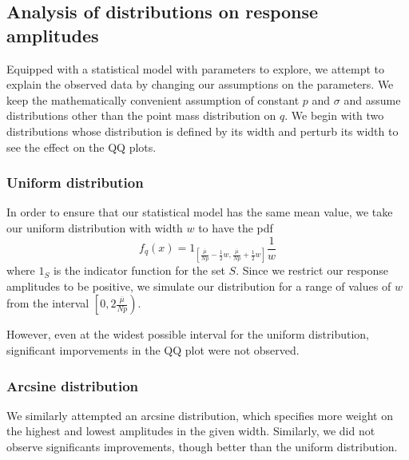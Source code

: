 \documentclass{article}
\begin{document}
\subsection{Analysis of distributions on response amplitudes}
Equipped with a statistical model with parameters to explore, we attempt to explain the observed data by changing our assumptions on the parameters. We keep the mathematically convenient assumption of constant $p$ and $\sigma$ and assume distributions other than the point mass distribution on $q$. We begin with two distributions whose distribution is defined by its width and perturb its width to see the effect on the QQ plots.

\subsubsection{Uniform distribution}
In order to ensure that our statistical model has the same mean value, we take our uniform distribution with width $w$ to have the pdf
\[
  f_q(x) = 1_{\left[\frac{\overline{\mu}}{Np}-\frac12 w,\frac{\overline{\mu}}{Np}+\frac12 w\right]} \frac1{w}
\]
where $1_S$ is the indicator function for the set $S$. Since we restrict our response amplitudes to be positive, we simulate our distribution for a range of values of $w$ from the interval $\left[0,2\frac{\overline{\mu}}{Np}\right)$.

However, even at the widest possible interval for the uniform distribution, significant imporvements in the QQ plot were not observed.

\subsubsection{Arcsine distribution}
We similarly attempted an arcsine distribution, which specifies more weight on the highest and lowest amplitudes in the given width. Similarly, we did not observe significants improvements, though better than the uniform distribution.
\end{document}
